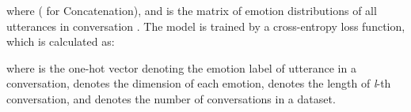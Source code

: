 \documentclass[letterpaper]{article} \usepackage{aaai21}  \usepackage{times}  \usepackage{helvet} \usepackage{courier}  \usepackage[hyphens]{url}  \usepackage{graphicx} \urlstyle{rm} \def\UrlFont{\rm}  \usepackage{natbib}  \usepackage{caption} \usepackage{multirow}
\begin{document}
where ( for Concatenation),  and  is the matrix of emotion distributions of all utterances in conversation . The model is trained by a cross-entropy loss function, which is calculated as:

where  is the one-hot vector denoting the emotion label of utterance  in a conversation,  denotes the dimension of each emotion,  denotes the length of \emph{l}-th conversation, and  denotes the number of conversations in a dataset. 

\begin{table*}
\centering
{}
\end{table*}
\end{document}
